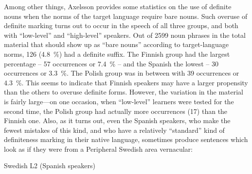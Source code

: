 \begin{styleBodytextC}
Among other things, Axelsson provides some statistics on the use of definite nouns when the norms of the target language require bare nouns. Such overuse of definite marking turns out to occur in the speech of all three groups, and both with “low-level” and “high-level” speakers. Out of 2599 noun phrases in the total material that should show up as “bare nouns” according to target-language norms, 126 (4.8~\%) had a definite suffix. The Finnish group had the largest percentage – 57 occurrences or 7.4~\% – and the Spanish the lowest – 30 occurrences or 3.3~\%. The Polish group was in between with 39 occurrences or 4.3~\%. This seems to indicate that Finnish speakers may have a larger propensity than the others to overuse definite forms. However, the variation in the material is fairly large—on one occasion, when “low-level” learners were tested for the second time, the Polish group had actually more occurrences (17) than the Finnish one. Also, as it turns out, even the Spanish speakers, who make the fewest mistakes of this kind, and who have a relatively “standard” kind of definiteness marking in their native language, sometimes produce sentences which look as if they were from a Peripheral Swedish area vernacular:

\end{styleBodytextC}

\begin{listWWNumileveli}
\item 

\begin{styleExample}
Swedish L2 (Spanish speakers)

\end{styleExample}

\end{listWWNumileveli}

\begin{listWWNumlvleveli}
\item 

\end{listWWNumlvleveli}

